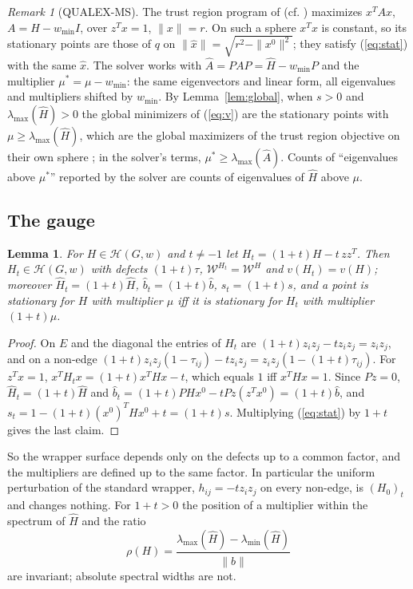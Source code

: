 \documentclass[11pt]{article}
\newtheorem{lem}[thm]{Lemma}
\theoremstyle{definition}
\theoremstyle{remark}
\newtheorem{rem}[thm]{Remark}
\newcommand{\Hc}{\mathcal{H}}
\newcommand{\Wc}{\mathcal{W}}
\newcommand{\hH}{\hat{H}}
\newcommand{\hb}{\hat{b}}
\newcommand{\hx}{\hat{x}}
\newcommand{\lmax}{\lambda_{\max}}
\newcommand{\lmin}{\lambda_{\min}}
\begin{document}
\begin{rem}[QUALEX-MS]
\label{rem:qualex}
The trust region program of \cite{B02} (cf. \cite[Theorem~3]{CW}) maximizes
$x^TAx$, $A=H-w_{\min}I$, over $z^Tx=1$, $\|x\|=r$. On such a sphere
$x^Tx$ is constant, so its stationary points are those of $q$ on
$\|\hx\|=\sqrt{r^2-\|x^0\|^2}$; they satisfy (\ref{eq:stat}) with the same
$\hx$. The solver works with $\hat A=PAP=\hH-w_{\min}P$ and the multiplier
$\mu^*=\mu-w_{\min}$: the same eigenvectors and linear form, all eigenvalues
and multipliers shifted by $w_{\min}$. By Lemma~\ref{lem:global}, when $s>0$
and $\lmax(\hH)>0$ the global minimizers of (\ref{eq:v}) are the stationary
points with $\mu\geq\lmax(\hH)$, which are the global maximizers of the
trust region objective on their own sphere \cite{MS83}; in the solver's
terms, $\mu^*\geq\lmax(\hat A)$. Counts of ``eigenvalues above $\mu^*$'' reported by the solver are counts of
eigenvalues of $\hH$ above $\mu$.
\end{rem}

\subsection{The gauge}

\begin{lem}
\label{lem:gauge}
For $H\in\Hc(G,w)$ and $t\neq-1$ let $H_t=(1+t)H-t\,zz^T$. Then
$H_t\in\Hc(G,w)$ with defects $(1+t)\tau$, $\Wc^{H_t}=\Wc^H$ and
$v(H_t)=v(H)$; moreover $\hH_t=(1+t)\hH$, $\hb_t=(1+t)\hb$, $s_t=(1+t)s$,
and a point is stationary for $H$ with multiplier $\mu$ iff it is
stationary for $H_t$ with multiplier $(1+t)\mu$.
\end{lem}
\begin{proof}
On $E$ and the diagonal the entries of $H_t$ are
$(1+t)z_iz_j-tz_iz_j=z_iz_j$, and on a non-edge
$(1+t)z_iz_j(1-\tau_{ij})-tz_iz_j=z_iz_j(1-(1+t)\tau_{ij})$. For $z^Tx=1$,
$x^TH_tx=(1+t)x^THx-t$, which equals $1$ iff $x^THx=1$. Since $Pz=0$,
$\hH_t=(1+t)\hH$ and $\hb_t=(1+t)PHx^0-tPz(z^Tx^0)=(1+t)\hb$, and
$s_t=1-(1+t)(x^0)^THx^0+t=(1+t)s$. Multiplying (\ref{eq:stat}) by $1+t$
gives the last claim.
\end{proof}

So the wrapper surface depends only on the defects up to a common factor,
and the multipliers are defined up to the same factor. In particular the
uniform perturbation of the standard wrapper, $h_{ij}=-t z_iz_j$ on every
non-edge, is $(H_0)_t$ and changes nothing. For $1+t>0$
the position of a multiplier within the spectrum of $\hH$ and the ratio
\[ \rho(H)=\frac{\lmax(\hH)-\lmin(\hH)}{\|\hb\|} \]
are invariant; absolute spectral widths are not.
\end{document}
